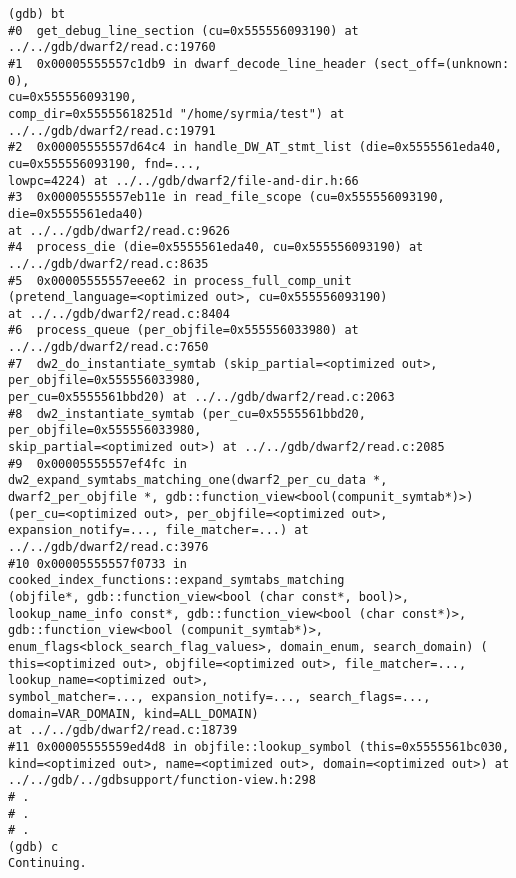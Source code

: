 \documentclass{report}
\begin{document}
\begin{verbatim}
(gdb) bt
#0  get_debug_line_section (cu=0x555556093190) at 
../../gdb/dwarf2/read.c:19760
#1  0x00005555557c1db9 in dwarf_decode_line_header (sect_off=(unknown: 0), 
cu=0x555556093190, 
comp_dir=0x55555618251d "/home/syrmia/test") at 
../../gdb/dwarf2/read.c:19791
#2  0x00005555557d64c4 in handle_DW_AT_stmt_list (die=0x5555561eda40, 
cu=0x555556093190, fnd=..., 
lowpc=4224) at ../../gdb/dwarf2/file-and-dir.h:66
#3  0x00005555557eb11e in read_file_scope (cu=0x555556093190, 
die=0x5555561eda40)
at ../../gdb/dwarf2/read.c:9626
#4  process_die (die=0x5555561eda40, cu=0x555556093190) at 
../../gdb/dwarf2/read.c:8635
#5  0x00005555557eee62 in process_full_comp_unit 
(pretend_language=<optimized out>, cu=0x555556093190)
at ../../gdb/dwarf2/read.c:8404
#6  process_queue (per_objfile=0x555556033980) at ../../gdb/dwarf2/read.c:7650
#7  dw2_do_instantiate_symtab (skip_partial=<optimized out>, 
per_objfile=0x555556033980, 
per_cu=0x5555561bbd20) at ../../gdb/dwarf2/read.c:2063
#8  dw2_instantiate_symtab (per_cu=0x5555561bbd20, per_objfile=0x555556033980, 
skip_partial=<optimized out>) at ../../gdb/dwarf2/read.c:2085
#9  0x00005555557ef4fc in dw2_expand_symtabs_matching_one(dwarf2_per_cu_data *,
dwarf2_per_objfile *, gdb::function_view<bool(compunit_symtab*)>) 
(per_cu=<optimized out>, per_objfile=<optimized out>, 
expansion_notify=..., file_matcher=...) at ../../gdb/dwarf2/read.c:3976
#10 0x00005555557f0733 in cooked_index_functions::expand_symtabs_matching
(objfile*, gdb::function_view<bool (char const*, bool)>, 
lookup_name_info const*, gdb::function_view<bool (char const*)>, 
gdb::function_view<bool (compunit_symtab*)>, 
enum_flags<block_search_flag_values>, domain_enum, search_domain) (
this=<optimized out>, objfile=<optimized out>, file_matcher=...,
lookup_name=<optimized out>, 
symbol_matcher=..., expansion_notify=..., search_flags=..., 
domain=VAR_DOMAIN, kind=ALL_DOMAIN)
at ../../gdb/dwarf2/read.c:18739
#11 0x00005555559ed4d8 in objfile::lookup_symbol (this=0x5555561bc030, 
kind=<optimized out>, name=<optimized out>, domain=<optimized out>) at 
../../gdb/../gdbsupport/function-view.h:298
# .
# .
# .
(gdb) c
Continuing.


\end{verbatim}
\end{document}
